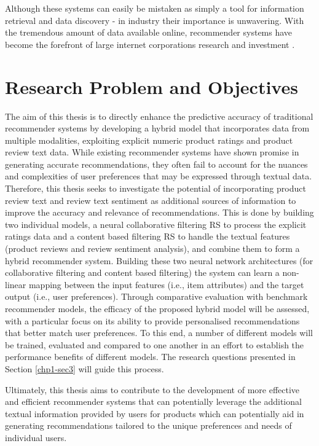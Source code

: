 Although these systems can easily be mistaken as simply a tool for information retrieval and data discovery - in industry their importance is unwavering. With the tremendous amount of data available online, recommender systems have become the forefront of large internet corporations research and investment \citep{steck2021deep}.




\section{Research Problem and Objectives}
\label{chp1-sec2}

The aim of this thesis is to directly enhance the predictive accuracy of traditional recommender systems by developing a hybrid model that incorporates data from multiple modalities, exploiting explicit numeric product ratings and product review text data. While existing recommender systems have shown promise in generating accurate recommendations, they often fail to account for the nuances and complexities of user preferences that may be expressed through textual data. Therefore, this thesis seeks to investigate the potential of incorporating product review text and review text sentiment as additional sources of information to improve the accuracy and relevance of recommendations. This is done by building two individual models, a neural collaborative filtering RS to process the explicit ratings data and a content based filtering RS to handle the textual features (product reviews and review sentiment analysis), and combine them to form a hybrid recommender system. Building these two neural network architectures (for collaborative filtering and content based filtering) the system can learn a non-linear mapping between the input features (i.e., item attributes) and the target output (i.e., user preferences). Through comparative evaluation with benchmark recommender models, the efficacy of the proposed hybrid model will be assessed, with a particular focus on its ability to provide personalised recommendations that better match user preferences. To this end, a number of different models will be trained, evaluated and compared to one another in an effort to establish the performance benefits of different models. The research questions presented in Section \ref{chp1-sec3} will guide this process.

Ultimately, this thesis aims to contribute to the development of more effective and efficient recommender systems that can potentially leverage the additional textual information provided by users for products which can potentially aid in generating recommendations tailored to the unique preferences and needs of individual users.

